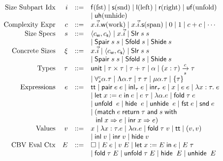\documentclass[preprint]{sigplanconf}
\newcommand{\thide}[1]{\left \{ #1 \right \}}
\newcommand{\arrow}[4]{#1\xrightarrow[#3]{#2}#4}
\newcommand{\symlet}{\mathsf{let\;}}
\newcommand{\symin}{\mathsf{\;in\;}}
\newcommand{\symand}{\mathsf{\;and\;}}
\newcommand{\symmatch}{\mathsf{match}}
\newcommand{\symwith}{\mathsf{\;with\;}}
\newcommand{\symreturn}{\mathsf{\;return\;}}
\newcommand{\syminl}{\mathsf{inl}}
\newcommand{\syminr}{\mathsf{inr}}
\newcommand{\symfold}{\mathsf{fold}}
\newcommand{\symSfold}{\mathsf{Sfold}}
\newcommand{\symunfold}{\mathsf{unfold}}
\newcommand{\symhide}{\mathsf{hide}}
\newcommand{\symShide}{\mathsf{Shide}}
\newcommand{\symunhide}{\mathsf{unhide}}
\newcommand{\sympair}{\mathsf{pair}}
\newcommand{\symtt}{\mathsf{tt}}
\newcommand{\symunit}{\mathsf{unit}}
\newcommand{\intro}[2]{(#1 : #2)}
\newcommand{\symfst}{\mathsf{fst}}
\newcommand{\symsnd}{\mathsf{snd}}
\newcommand{\symuf}{\mathsf{uf}}
\newcommand{\symuh}{\mathsf{uh}}
\newcommand{\syml}{\mathsf{l}}
\newcommand{\symr}{\mathsf{r}}
\newcommand{\symf}{\mathsf{f}}
\newcommand{\syms}{\mathsf{s}}
\newcommand{\symSpair}{\mathsf{Spair}}
\newcommand{\symSlr}{\mathsf{Slr}}
\newcommand{\symwork}{\mathsf{w}}
\newcommand{\symspan}{\mathsf{s}}
\newcommand{\Sstats}[1]{\left \langle #1 \right \rangle}
\begin{document}
\begin{figure}
$$\begin{array}{rrcl}
  \textrm{Size Subpart Idx} & i &::=& \symf \textrm{(fst)} \mid \syms \textrm{(snd)} \mid \syml \textrm{(left)} \mid \symr \textrm{(right)} \mid \symuf \textrm{(unfold)} \\
  & & & \mid \symuh \textrm{(unhide)} \\
  \textrm{Complexity Expr} & c &::=& x.\vec{i}.\symwork \textrm{(work)} \mid x.\vec{i}.\symspan \textrm{(span)} \mid 0 \mid 1 \mid c+c \mid \cdots \\
  \textrm{Size Specs} & s &::=& \Sstats{c_\symwork,c_\symspan} \mid x.\vec{i} \mid \symSlr\;s\;s \\
  & & & \mid \symSpair\;s\;s \mid \symSfold\;s \mid \symShide\;s \\
  \textrm{Concrete Sizes} & \xi &::=& x.\vec{i} \mid \Sstats{c_\symwork,c_\symspan} \mid \symSlr\;s\;s \\
  & & & \mid \symSpair\;s\;s \mid \symSfold\;s \mid \symShide\;s \\
  \textrm{Types} & \tau &::=& \symunit \mid \tau\times\tau \mid \tau+\tau \mid \alpha \mid \arrow{\intro{x}{\tau}}{c}{s}{\tau} \\
  & & & \mid \forall^c_s \alpha.\tau \mid \Lambda \alpha.\tau \mid \tau\;\tau \mid \mu \alpha.\tau \mid \thide\tau \\
  \textrm{Expressions} & e &::=& \symtt \mid \sympair\;e\;e \mid \syminl_\tau\;e \mid \syminr_\tau\;e \mid x \mid e\;e \mid \lambda x:\tau.\;e \\
  & & & \mid \symlet x := e \symin e \mid e\;\tau \mid \lambda \alpha.e \mid \symfold\;\tau\;e \\
  & & & \mid \symunfold\;\;e \mid \symhide\;\;e \mid \symunhide\;\;e \mid \symfst\;e \mid \symsnd\;e \\
  & & & \mid (\symmatch\;e \symreturn \tau \symand s \symwith \\
  & & & \hspace{.1in} \syminl\;x\Rightarrow e\;|\;\syminr\;x\Rightarrow e) \\
  \textrm{Values} & v &::=& x \mid \lambda x:\tau.e \mid \lambda \alpha.e \mid \symfold\;\tau\;v \mid \symtt \mid (v,v) \\
  & & & \mid \syminl\;v \mid \syminr\;v \mid \symhide\; v \\
  \textrm{CBV Eval Ctx} & E &::=& \Box \mid E\;e \mid v\;E \mid \symlet x := E\symin e \mid E\;\tau \\
  & & & \mid \symfold\;\tau\;E \mid \symunfold\;\tau\;E \mid \symhide\;\;E \mid \symunhide\;\;E \\

\end{array}$$
\end{figure}
\end{document}
